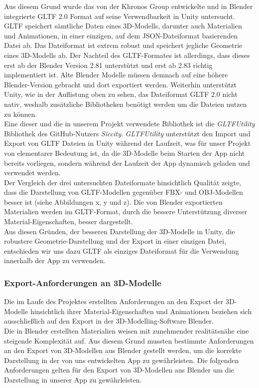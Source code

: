 \documentclass[titlepage, a4paper, 11pt]{scrartcl}
\begin{document}
  Aus diesem Grund wurde das von der Khronos Group entwickelte und in Blender integrierte GLTF 2.0 Format auf seine Verwendbarkeit in Unity untersucht. GLTF speichert sämtliche Daten eines 3D-Modells, darunter auch Materialien und Animationen, in einer einzigen, auf dem JSON-Dateiformat basierenden Datei ab. Das Dateiformat ist extrem robust und speichert jegliche Geometrie eines 3D-Modells ab. Der Nachteil des GLTF-Formates ist allerdings, dass dieses erst ab der Blender Version 2.81 unterstützt und erst ab 2.83 richtig implementiert ist. Alte Blender Modelle müssen demnach auf eine höhere Blender-Version gebracht und dort exportiert werden. Weiterhin unterstützt Unity, wie in der Auflistung oben zu sehen, das Dateiformat GLTF 2.0 nicht nativ, weshalb zusätzliche Bibliotheken benötigt werden um die Dateien nutzen zu können.\\
  Eine dieser und die in unserem Projekt verwendete Bibliothek ist die \textit{GLTFUtility} Bibliothek des GitHub-Nutzers \textit{Siccity}. \textit{GLTFUtility} unterstützt den Import und Export von GLTF Dateien in Unity während der Laufzeit, was für unser Projekt von elementarer Bedeutung ist, da die 3D-Modelle beim Starten der App nicht bereits vorliegen, sondern während der Laufzeit der App dynamisch geladen und verwendet werden.\\

  Der Vergleich der drei untersuchten Dateiformate hinsichtlich Qualität zeigte, dass die Darstellung von GLTF-Modellen gegenüber FBX- und OBJ-Modellen besser ist (siehe Abbildungen x, y und z). Die von Blender exportierten Materialien werden im GLTF-Format, durch die bessere Unterstützung diverser Material-Eigenschaften, besser dargestellt.\\

  Aus diesen Gründen, der besseren Darstellung der 3D-Modelle in Unity, die robustere Geometrie-Darstellung und der Export in einer einzigen Datei, entschieden wir uns dazu GLTF als einziges Dateiformat für die Verwendung innerhalb der App zu verwenden.
  \subsubsection{Export-Anforderungen an 3D-Modelle}
  Die im Laufe des Projektes erstellten Anforderungen an den Export der 3D-Modelle hinsichtlich ihrer Material-Eigenschaften und Animationen beziehen sich ausschließlich auf den Export in der 3D-Modelling-Software Blender.\\

  Die in Blender erstellten Materialien weisen mit zunehmender realitätsnähe eine steigende Komplexität auf. Aus diesem Grund mussten bestimmte Anforderungen an den Export von 3D-Modellen aus Blender gestellt werden, um die korrekte Darstellung in der von uns entwickelten App zu gewährleisten. Die folgenden Anforderungen gelten für den Export von 3D-Modellen aus Blender um die Darstellung in unserer App zu gewährleisten.\\
\end{document}
